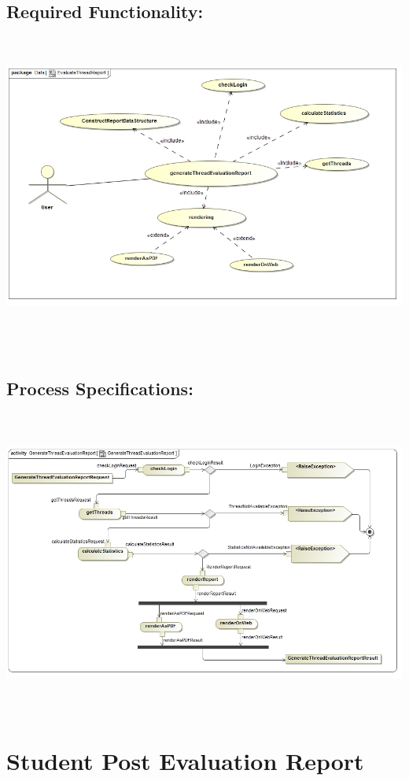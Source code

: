 \documentclass[a4paper,11pt]{article}
\begin{document}
\subsection{Required Functionality:} 
\includegraphics[width=15cm,height=10cm]{./Images/Report/Thread_FR}\\
\\
\subsection{Process Specifications:} 
\includegraphics[width=15cm,height=10cm]{./Images/Report/ThreadReport_PS}

\section{Student Post Evaluation Report}
\end{document}
